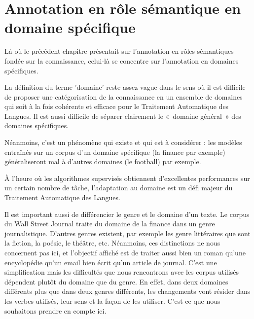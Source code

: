 

\chapter{Annotation en rôle sémantique en domaine spécifique}
\label{ch:domainsrl}



Là où le précédent chapitre présentait sur l'annotation en rôles sémantiques
fondée sur la connaissance, celui-là se concentre sur l'annotation en domaines
spécifiques.

La définition du terme 'domaine' reste assez vague dans le sens où il est
difficile de proposer une catégorisation de la connaissance en un ensemble de
domaines qui soit à la fois cohérente et efficace pour le Traitement Automatique
des Langues. Il est aussi difficile de séparer clairement le «~domaine
général~» des domaines spécifiques.


Néanmoins, c'est un phénomène qui existe et qui est à considérer : les modèles
entraînés sur un corpus d'un domaine spécifique (la finance par exemple)
généraliseront mal à d'autres domaines (le football) par exemple. %

À l'heure où les algorithmes supervisés obtiennent d'excellentes performances
sur un certain nombre de tâche, l'adaptation au domaine est un défi majeur du
Traitement Automatique des Langues.

Il est important aussi de différencier le genre et le domaine d'un texte. Le
corpus du Wall Street Journal traite du domaine de la finance dans un genre
journalistique. D'autres genres existent, par exemple les genre littéraires que
sont la fiction, la poésie, le théâtre, etc. Néanmoins, ces distinctions ne
nous concernent pas ici, et l'objectif affiché est de traiter aussi bien un
roman qu'une encyclopédie qu'un email bien écrit qu'un article de journal.
C'est une simplification mais les difficultés que nous rencontrons avec les
corpus utilisés dépendent plutôt du domaine que du genre. En effet, dans deux
domaines différents plus que dans deux genres différents, les changements vont
résider dans les verbes utilisés, leur sens et la façon de les utiliser. C'est
ce que nous souhaitons prendre en compte ici.

